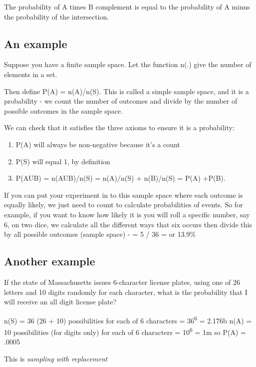 \documentclass[]{book}
\providecommand{\tightlist}{%
  \setlength{\itemsep}{0pt}\setlength{\parskip}{0pt}}
\theoremstyle{definition}
\theoremstyle{definition}
\theoremstyle{definition}
\theoremstyle{remark}
\begin{document}
The probability of A times B complement is equal to the probability of A
minus the probability of the intersection.

\subsection{An example}\label{an-example}

Suppose you have a finite sample space. Let the function n(.) give the
number of elements in a set.

Then define P(A) = n(A)/n(S). This is called a simple sample space, and
it is a probability - we count the number of outcomes and divide by the
number of possible outcomes in the sample space.

We can check that it satisfies the three axioms to ensure it is a
probability:

\begin{enumerate}
\def\labelenumi{\arabic{enumi}.}
\tightlist
\item
  P(A) will always be non-negative because it's a count
\item
  P(S) will equal 1, by definition
\item
  P(AUB) = n(AUB)/n(S) = n(A)/n(S) + n(B)/n(S) = P(A) +P(B).
\end{enumerate}

If you can put your experiment in to this sample space where each
outcome is equally likely, we just need to count to calculate
probabilities of events. So for example, if you want to know how likely
it is you will roll a specific number, say 6, on two dice, we calculate
all the different ways that six occurs then divide this by all possible
outcomes (sample space) - = 5 / 36 = or 13.9\%

\subsection{Another example}\label{another-example}

If the state of Massachusetts issues 6-character license plates, using
one of 26 letters and 10 digits randomly for each character, what is the
probability that I will receive an all digit license plate?

n(S) = 36 (26 + 10) possibilities for each of 6 characters =
36\textsuperscript{6} = 2.176b n(A) = 10 possibilities (for digits only)
for each of 6 characters = 10\textsuperscript{6} = 1m so P(A) = .0005

This is \emph{sampling with replacement}
\end{document}

